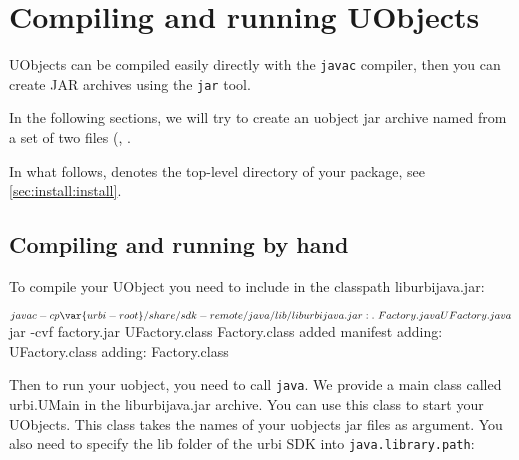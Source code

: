 \section{Compiling and running UObjects}

UObjects can be compiled easily directly with the \lstinline{javac}
compiler, then you can create JAR archives using the \lstinline{jar} tool.

In the following sections, we will try to create an uobject jar archive
named  from a set of two files (,
.

In what follows,  denotes the top-level directory of your
\usdk package, see \autoref{sec:install:install}.

\subsection{Compiling and running by hand}

To compile your UObject you need to include in the classpath
liburbijava.jar:

\begin{shell}
$ javac -cp \var{urbi-root}/share/sdk-remote/java/lib/liburbijava.jar:. \
  Factory.java UFactory.java
$ jar -cvf factory.jar UFactory.class Factory.class
added manifest
adding: UFactory.class
adding: Factory.class
\end{shell}

Then to run your uobject, you need to call \lstinline{java}. We provide a
main class called urbi.UMain in the liburbijava.jar archive. You can use
this class to start your UObjects. This class takes the names of your
uobjects jar files as argument.  You also need to specify the lib folder of
the urbi SDK into \lstinline{java.library.path}:


